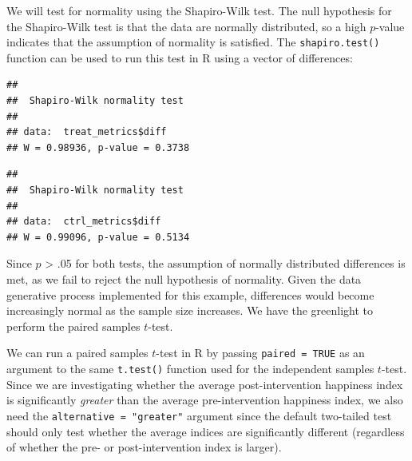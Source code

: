 \documentclass[]{book}
\newenvironment{Shaded}{\begin{snugshade}}{\end{snugshade}}
\newcommand{\CommentTok}[1]{\textcolor[rgb]{0.56,0.35,0.01}{\textit{#1}}}
\newcommand{\KeywordTok}[1]{\textcolor[rgb]{0.13,0.29,0.53}{\textbf{#1}}}
\newcommand{\NormalTok}[1]{#1}
\newcommand{\OperatorTok}[1]{\textcolor[rgb]{0.81,0.36,0.00}{\textbf{#1}}}
\begin{document}
We will test for normality using the Shapiro-Wilk test. The null hypothesis for the Shapiro-Wilk test is that the data are normally distributed, so a high \(p\)-value indicates that the assumption of normality is satisfied. The \texttt{shapiro.test()} function can be used to run this test in R using a vector of differences:

\begin{Shaded}
\end{Shaded}

\begin{verbatim}
## 
##  Shapiro-Wilk normality test
## 
## data:  treat_metrics$diff
## W = 0.98936, p-value = 0.3738
\end{verbatim}

\begin{Shaded}
\end{Shaded}

\begin{verbatim}
## 
##  Shapiro-Wilk normality test
## 
## data:  ctrl_metrics$diff
## W = 0.99096, p-value = 0.5134
\end{verbatim}

Since \(p\) \textgreater{} .05 for both tests, the assumption of normally distributed differences is met, as we fail to reject the null hypothesis of normality. Given the data generative process implemented for this example, differences would become increasingly normal as the sample size increases. We have the greenlight to perform the paired samples \(t\)-test.

We can run a paired samples \(t\)-test in R by passing \texttt{paired\ =\ TRUE} as an argument to the same \texttt{t.test()} function used for the independent samples \(t\)-test. Since we are investigating whether the average post-intervention happiness index is significantly \emph{greater} than the average pre-intervention happiness index, we also need the \texttt{alternative\ =\ "greater"} argument since the default two-tailed test should only test whether the average indices are significantly different (regardless of whether the pre- or post-intervention index is larger).
\end{document}
